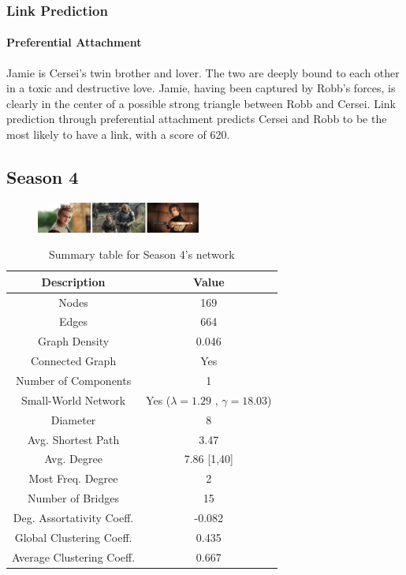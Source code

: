\documentclass[10pt,twocolumn,letterpaper]{article}
\begin{document}
\subsubsection{Link Prediction}

\paragraph{Preferential Attachment}

Jamie is Cersei's twin brother and lover. The two are deeply bound to each other in a toxic and destructive love. Jamie, having been captured by Robb's forces, is clearly in the center of a possible strong triangle between Robb and Cersei. Link prediction through preferential attachment predicts Cersei and Robb to be the most likely to have a link, with a score of 620.

\newpage

\subsection{Season 4}

\begin{figure}[!h]
    \centering
    \includegraphics[width=0.48\textwidth]{img/s4/frames_s4.jpg}
\end{figure}

\begin{table}[!h]
    \centering
    \small
    \begin{tabular}{c|c}
        Description & Value  \\
        \hline
        Nodes & 169\\
        Edges & 664 \\
        Graph Density & 0.046 \\
        Connected Graph & Yes \\
        Number of Components & 1 \\
        Small-World Network & Yes ($\lambda=1.29$ , $\gamma=18.03$) \\
        Diameter & 8 \\
        Avg. Shortest Path & 3.47 \\
        Avg. Degree & 7.86 [1,40] \\
        Most Freq. Degree & 2 \\
        Number of Bridges & 15 \\
        Deg. Assortativity Coeff. & -0.082\\
        Global Clustering Coeff. & 0.435 \\
        Average Clustering Coeff. & 0.667 \\
        \hline 
    \end{tabular}
    \vspace{0.2cm}
    \caption{Summary table for Season 4's network}
    \label{tab:my_label}
\end{table} 
\end{document}
